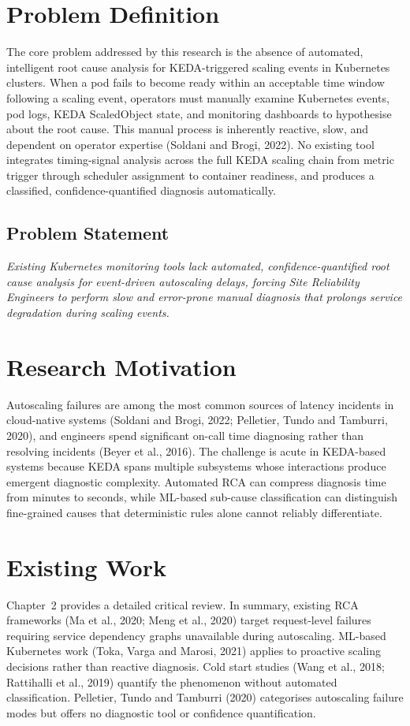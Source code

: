 \section{Problem Definition}
The core problem addressed by this research is the absence of automated, intelligent root cause analysis for KEDA-triggered scaling events in Kubernetes clusters. When a pod fails to become ready within an acceptable time window following a scaling event, operators must manually examine Kubernetes events, pod logs, KEDA ScaledObject state, and monitoring dashboards to hypothesise about the root cause. This manual process is inherently reactive, slow, and dependent on operator expertise (Soldani and Brogi, 2022). No existing tool integrates timing-signal analysis across the full KEDA scaling chain from metric trigger through scheduler assignment to container readiness, and produces a classified, confidence-quantified diagnosis automatically.

\subsection{Problem Statement}
\textit{Existing Kubernetes monitoring tools lack automated, confidence-quantified root cause analysis for event-driven autoscaling delays, forcing Site Reliability Engineers to perform slow and error-prone manual diagnosis that prolongs service degradation during scaling events.}

\section{Research Motivation}
Autoscaling failures are among the most common sources of latency incidents in cloud-native systems (Soldani and Brogi, 2022; Pelletier, Tundo and Tamburri, 2020), and engineers spend significant on-call time diagnosing rather than resolving incidents (Beyer et al., 2016). The challenge is acute in KEDA-based systems because KEDA spans multiple subsystems whose interactions produce emergent diagnostic complexity. Automated RCA can compress diagnosis time from minutes to seconds, while ML-based sub-cause classification can distinguish fine-grained causes that deterministic rules alone cannot reliably differentiate.

\section{Existing Work}
Chapter~2 provides a detailed critical review. In summary, existing RCA frameworks (Ma et al., 2020; Meng et al., 2020) target request-level failures requiring service dependency graphs unavailable during autoscaling. ML-based Kubernetes work (Toka, Varga and Marosi, 2021) applies to proactive scaling decisions rather than reactive diagnosis. Cold start studies (Wang et al., 2018; Rattihalli et al., 2019) quantify the phenomenon without automated classification. Pelletier, Tundo and Tamburri (2020) categorises autoscaling failure modes but offers no diagnostic tool or confidence quantification.

